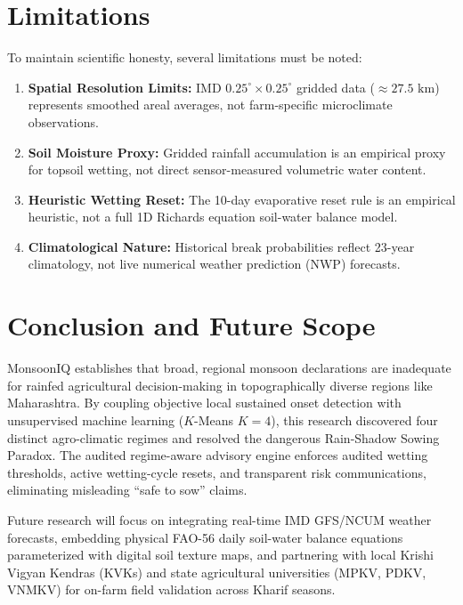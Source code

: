 \documentclass[conference]{IEEEtran}
\begin{document}
\section{Limitations}
To maintain scientific honesty, several limitations must be noted:
\begin{enumerate}
    \item \textbf{Spatial Resolution Limits:} IMD $0.25^\circ \times 0.25^\circ$ gridded data ($\approx 27.5\text{ km}$) represents smoothed areal averages, not farm-specific microclimate observations.
    \item \textbf{Soil Moisture Proxy:} Gridded rainfall accumulation is an empirical proxy for topsoil wetting, not direct sensor-measured volumetric water content.
    \item \textbf{Heuristic Wetting Reset:} The 10-day evaporative reset rule is an empirical heuristic, not a full 1D Richards equation soil-water balance model.
    \item \textbf{Climatological Nature:} Historical break probabilities reflect 23-year climatology, not live numerical weather prediction (NWP) forecasts.
\end{enumerate}

\section{Conclusion and Future Scope}
MonsoonIQ establishes that broad, regional monsoon declarations are inadequate for rainfed agricultural decision-making in topographically diverse regions like Maharashtra. By coupling objective local sustained onset detection with unsupervised machine learning ($K$-Means $K=4$), this research discovered four distinct agro-climatic regimes and resolved the dangerous Rain-Shadow Sowing Paradox. The audited regime-aware advisory engine enforces audited wetting thresholds, active wetting-cycle resets, and transparent risk communications, eliminating misleading ``safe to sow'' claims.

Future research will focus on integrating real-time IMD GFS/NCUM weather forecasts, embedding physical FAO-56 daily soil-water balance equations parameterized with digital soil texture maps, and partnering with local Krishi Vigyan Kendras (KVKs) and state agricultural universities (MPKV, PDKV, VNMKV) for on-farm field validation across Kharif seasons.



\end{document}

